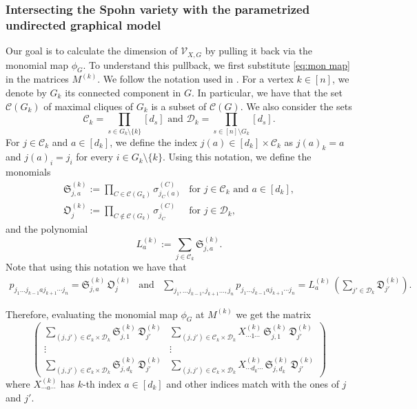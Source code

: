 \documentclass[11pt]{amsart}
\numberwithin{equation}{section}
\theoremstyle{plain}
\numberwithin{theorem}{section}
\theoremstyle{definition}
\begin{document}
\subsubsection{Intersecting the Spohn variety with the parametrized undirected graphical model} Our goal is to calculate the dimension of  $\mathcal V_{X,G}$ by pulling it back via the monomial map $\phi_G$. To understand this pullback, we first substitute \eqref{eq:mon map} in the matrices $M^{(k)}$.  We follow the notation used in \cite{portakal2024game}. 
For a vertex $k\in[n]$, we denote by $G_k$ its connected component in $G$. In particular, we have that the set $\mathcal{C}(G_k)$ of maximal cliques of $G_k$ is a subset of $\mathcal{C}(G)$.
We also consider the sets
$$\mathscr C_k=\displaystyle\prod_{s\in G_k\setminus\{k\}}[d_s] \text{ and }\mathscr D_k=\displaystyle\prod_{s\in[n]\setminus G_k}[d_s].$$
For $j\in \mathscr C_k$ and $a\in [d_k]$, we define the index $j(a)\in [d_k]\times \mathscr C_k$ as $j(a)_k=a$ and $j(a)_i=j_i$ for every $i\in G_k\setminus\{k\}$. Using this notation, we define the monomials
\begin{equation*}
\begin{array}{cl}
\displaystyle\mathfrak S_{j,a}^{(k)}:=\prod_{C\in\mathcal C(G_k)}\sigma_{j_C(a)}^{(C)} &\text{for }j\in \mathscr C_k \text{ and } a\in [d_k],\\
\displaystyle\mathfrak O_{j}^{(k)}:=\prod_{C\not\in\mathcal C(G_k)}\sigma_{j_C}^{(C)} &\text{for }j\in \mathscr D_k,
\end{array}
\end{equation*}
and the polynomial
\begin{equation}\label{eq: poly L}
L_a^{(k)}:=
\sum_{j\in\mathscr C_k}\mathfrak S_{j,a}^{(k)}.
\end{equation}
Note that using this notation we have that 
\[
\begin{array}{ccc}
p_{j_1\ldots j_{k-1}aj_{k+1}\cdots j_n}=\displaystyle\mathfrak S_{j,a}^{(k)}\, \mathfrak O_{j}^{(k)}
&\text{and}&\displaystyle
\sum_{j_1,\ldots j_{k-1},j_{k+1}\ldots,j_n}p_{j_1\ldots j_{k-1}aj_{k+1}\cdots j_n}= L_a^{(k)}\, \left(
\sum_{j'\in\mathscr D_k}\mathfrak D_{j'}^{(k)}\right).
\end{array}
\]

\noindent Therefore, evaluating the monomial map $\phi_G$ at $M^{(k)}$ we get the matrix
 \begin{equation}\label{eq:matrix 1}
\begin{pmatrix}
\displaystyle
\sum_{(j,j')\in\mathscr C_k\times\mathscr D_k}\mathfrak S_{j,1}^{(k)}\,\mathfrak D_{j'}^{(k)} & \displaystyle
\sum_{(j,j')\in\mathscr C_k\times\mathscr D_k}X_{\cdots 1\cdots}^{(k)}\,\mathfrak S_{j,1}^{(k)}\,\mathfrak D_{j'}^{(k)}\\ \vdots &\vdots \\
\displaystyle
\sum_{(j,j')\in\mathscr C_k\times\mathscr D_k}\mathfrak S_{j,d_k}^{(k)}\,\mathfrak D_{j'}^{(k)} & \displaystyle
\sum_{(j,j')\in\mathscr C_k\times\mathscr D_k}X_{\cdots d_k\cdots}^{(k)}\,\mathfrak S_{j,d_k}^{(k)}\,\mathfrak D_{j'}^{(k)}
    
\end{pmatrix}
 \end{equation}
 where $X^{(k)}_{\cdots a\cdots}$ has $k$-th index $a\in[d_k]$ and other indices match with the ones of $j$ and $j'$.  
\end{document}
